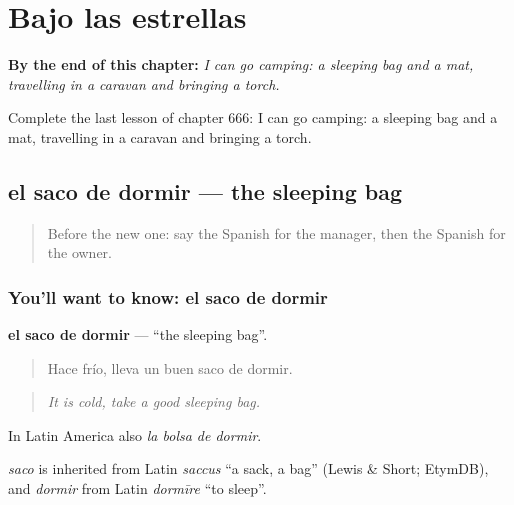 
\chapter{Bajo las estrellas}
\label{ch:es-bajo-las-estrellas}

\begin{chapteropening}
\textbf{By the end of this chapter:} \emph{I can go camping: a sleeping bag and a mat, travelling in a caravan and bringing a torch.}

Complete the last lesson of chapter 666: I can go camping: a sleeping bag and a mat, travelling in a caravan and bringing a torch.
\end{chapteropening}

\section[el saco de dormir]{el saco de dormir — the sleeping bag}

\label{lesson:ES-C666-saco-de-dormir}



\begin{quote}
Before the new one: say the Spanish for the manager, then the Spanish for the owner.
\end{quote}

\subsection*{You'll want to know: el saco de dormir}
\textbf{el saco de dormir} — \textquotedblleft{}the sleeping bag\textquotedblright{}.

\begin{quote}
Hace frío, lleva un buen saco de dormir.
\end{quote}

\begin{quote}
\emph{It is cold, take a good sleeping bag.}
\end{quote}

In Latin America also \emph{la bolsa de dormir}.

\begin{cousinweb}
\emph{saco} is inherited from Latin \emph{saccus} \textquotedblleft{}a sack, a bag\textquotedblright{} (Lewis \& Short; EtymDB), and \emph{dormir} from Latin \emph{dormīre} \textquotedblleft{}to sleep\textquotedblright{}.
\end{cousinweb}


